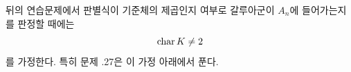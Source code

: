 \begin{remark}[연습문제의 표수 관례]
뒤의 연습문제에서 판별식이 기준체의 제곱인지 여부로 갈루아군이
$A_n$에 들어가는지를 판정할 때에는
\[
  \operatorname{char} K\ne2
\]
를 가정한다. 특히 문제 \thechapter.27은 이 가정 아래에서 푼다.
\end{remark}
